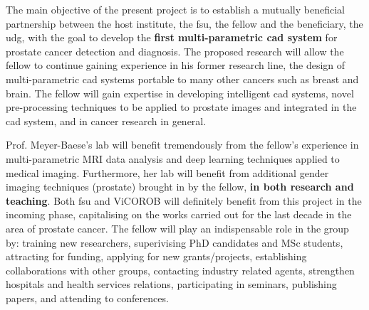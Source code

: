 The main objective of the present project is to establish a mutually beneficial partnership between the host institute, the \ac{fsu}, the fellow and the beneficiary, the \ac{udg}, with the goal to develop the \textbf{first multi-parametric \ac{cad} system} for prostate cancer detection and diagnosis.
The proposed research will allow the fellow to continue gaining experience in his former research line, the design of multi-parametric \ac{cad} systems portable to many other cancers such as breast and brain.
The fellow will gain expertise in developing intelligent \ac{cad} systems, novel pre-processing techniques to be applied to prostate images and integrated in the \ac{cad} system, and in cancer research in general.

Prof. Meyer-Baese's lab will benefit tremendously from the fellow's experience in multi-parametric MRI data analysis and deep learning techniques applied to medical imaging.
Furthermore, her lab will benefit from additional gender imaging techniques (prostate) brought in by the fellow, \textbf{in both research and teaching}.
Both \ac{fsu} and ViCOROB  will definitely benefit from this project in the incoming phase, capitalising on the works carried out for the last decade in the area of prostate cancer.
The fellow will play an indispensable role in the group by: training new researchers, superivising PhD candidates and MSc students, attracting for funding, applying for new grants/projects,  establishing collaborations with other groups, contacting industry related agents, strengthen hospitals and health services relations, participating in seminars, publishing papers, and attending to conferences.


